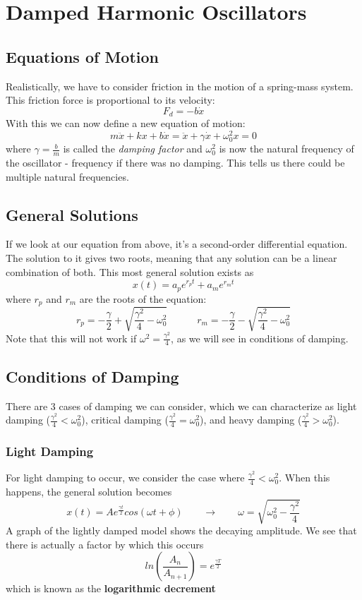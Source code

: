 \documentclass[11pt]{article}
\begin{document}
\section{Damped Harmonic Oscillators}
\subsection{Equations of Motion}
Realistically, we have to consider friction in the motion of a spring-mass system. This friction force is proportional to its velocity:
$$ F_d = -b \dot x$$
With this we can now define a new equation of motion:
$$ m\ddot x + kx + b\dot x = \ddot x + \gamma \dot x + \omega_0 ^2 x = 0$$ where $\gamma = \frac{b}{m}$ is called the \textit{damping factor} and $\omega_0 ^2$ is now the natural frequency of the oscillator - frequency if there was no damping. This tells us there could be multiple natural frequencies.
\subsection{General Solutions}
If we look at our equation from above, it's a second-order differential equation. The solution to it gives two roots, meaning that any solution can be a linear combination of both. This most general solution exists as
$$x(t) = a_pe^{r_pt}+ a_me^{r_mt}$$
where $r_p$ and $r_m$ are the roots of the equation:
$$r_p = -\frac{\gamma}{2}+\sqrt{\frac{\gamma^2}{4}-\omega_0^2}
\quad \quad \quad r_m = -\frac{\gamma}{2}-\sqrt{\frac{\gamma^2}{4}-\omega_0^2}$$
Note that this will not work if $\omega^2 = \frac{\gamma^2}{4}$, as we will see in conditions of damping.
\subsection{Conditions of Damping}
There are 3 cases of damping we can consider, which we can characterize as light damping ($\frac{\gamma^2}{4} < \omega_0^2$), critical damping ($\frac{\gamma^2}{4} = \omega_0^2$), and heavy damping ($\frac{\gamma^2}{4} > \omega_0^2$).
\subsubsection{Light Damping}
For light damping to occur, we consider the case where $\frac{\gamma^2}{4} < \omega_0^2$. When this happens, the general solution becomes $$x(t) = Ae^{\frac{\gamma t}{2}}cos( \omega t + \phi) \quad \quad  \rightarrow  \quad \quad \omega = \sqrt{\omega_0 ^2 - \frac{\gamma ^2}{4}}$$
A graph of the lightly damped model shows the decaying amplitude. We see that there is actually a factor by which this occurs 
$$ ln\left(\frac{A_n}{A_{n+1}}\right) = e^{\frac{\gamma T}{2}}$$ which is known as the \textbf{logarithmic decrement}
\end{document}

